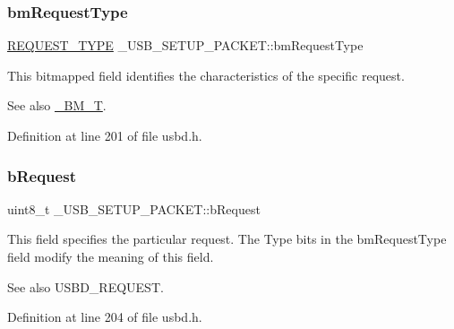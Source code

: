 \subsubsection{\texorpdfstring{bm\+Request\+Type}{bmRequestType}}
{\footnotesize\ttfamily \hyperlink{group___u_s_b_d___core_gac85164494feb72445fab7999a3723b6f}{R\+E\+Q\+U\+E\+S\+T\+\_\+\+T\+Y\+PE} \+\_\+\+U\+S\+B\+\_\+\+S\+E\+T\+U\+P\+\_\+\+P\+A\+C\+K\+E\+T\+::bm\+Request\+Type}

This bitmapped field identifies the characteristics of the specific request. \begin{DoxySeeAlso}{See also}
\hyperlink{struct___b_m___t}{\+\_\+\+B\+M\+\_\+T}. 
\end{DoxySeeAlso}


Definition at line 201 of file usbd.\+h.

\mbox{\label{struct___u_s_b___s_e_t_u_p___p_a_c_k_e_t_a95f462f8491a38e7ee662dcd95d5cb6a}} 
\subsubsection{\texorpdfstring{b\+Request}{bRequest}}
{\footnotesize\ttfamily uint8\+\_\+t \+\_\+\+U\+S\+B\+\_\+\+S\+E\+T\+U\+P\+\_\+\+P\+A\+C\+K\+E\+T\+::b\+Request}

This field specifies the particular request. The Type bits in the bm\+Request\+Type field modify the meaning of this field. \begin{DoxySeeAlso}{See also}
U\+S\+B\+D\+\_\+\+R\+E\+Q\+U\+E\+ST. 
\end{DoxySeeAlso}


Definition at line 204 of file usbd.\+h.

\mbox{\label{struct___u_s_b___s_e_t_u_p___p_a_c_k_e_t_a1f0ec0c931efe4a96d92b3ceea80b2a3}} 
